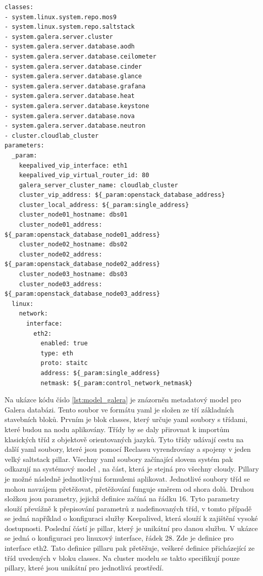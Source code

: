 \begin{lstlisting}[caption={Metadata model pro Galera databázi, zdroj: vlastní tvorba},label={lst:model_galera}]
classes:
- system.linux.system.repo.mos9
- system.linux.system.repo.saltstack
- system.galera.server.cluster
- system.galera.server.database.aodh
- system.galera.server.database.ceilometer
- system.galera.server.database.cinder
- system.galera.server.database.glance
- system.galera.server.database.grafana
- system.galera.server.database.heat
- system.galera.server.database.keystone
- system.galera.server.database.nova
- system.galera.server.database.neutron
- cluster.cloudlab_cluster
parameters:
  _param:
    keepalived_vip_interface: eth1
    keepalived_vip_virtual_router_id: 80
    galera_server_cluster_name: cloudlab_cluster
    cluster_vip_address: ${_param:openstack_database_address}
    cluster_local_address: ${_param:single_address}
    cluster_node01_hostname: dbs01
    cluster_node01_address: ${_param:openstack_database_node01_address}
    cluster_node02_hostname: dbs02
    cluster_node02_address: ${_param:openstack_database_node02_address}
    cluster_node03_hostname: dbs03
    cluster_node03_address: ${_param:openstack_database_node03_address}
  linux:
    network:
      interface:
        eth2:
          enabled: true
          type: eth
          proto: staitc        
          address: ${_param:single_address}
          netmask: ${_param:control_network_netmask}
\end{lstlisting}

Na ukázce kódu číslo \ref{lst:model_galera} je znázorněn metadatový model pro Galera databázi. Tento soubor ve formátu yaml je složen ze tří základních stavebních bloků. Prvním je blok classes, který určuje yaml soubory s třídami, které budou na nodu aplikovány. Třídy by se daly přirovnat k importům klasických tříd z objektově orientovaných jazyků. Tyto třídy udávají cestu na další yaml soubory, které jsou pomocí Reclassu vyrendrovány a spojeny v jeden velký saltstack pillar. Všechny yaml soubory začínající slovem systém pak odkazují na systémový model \cite{github_model}, na část, která je stejná pro všechny cloudy. Pillary je možné následně jednotlivými formulemi aplikovat. Jednotlivé soubory tříd se mohou navzájem přetěžovat, přetěžování funguje směrem od shora dolů. Druhou složkou jsou parametry, jejichž definice začíná na řádku 16. Tyto parametry slouží převážně k přepisování parametrů z nadefinovaných tříd, v tomto případě se jedná například o konfiguraci služby Keepalived, která slouží k zajištění vysoké dostupnosti. Poslední částí je pillar, který je unikátní pro danou službu. V ukázce se jedná o konfiguraci pro linuxový interface, řádek 28. Zde je definice pro interface eth2. Tato definice pillaru pak přetěžuje, veškeré definice přicházející ze tříd uvedených v bloku classes. Na cluster modelu se takto specifikují pouze pillary, které jsou unikátní pro jednotlivá prostředí.

